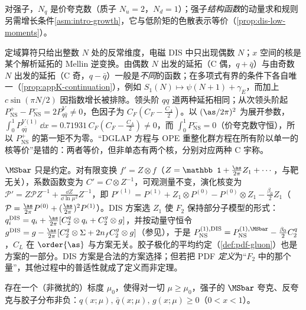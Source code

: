 对强子，$N_q$ 是价夸克数（质子 $N_u=2$，$N_d=1$）；强子\emph{结构函数}的动量求和规则另需增长条件\cref{asm:intro-growth}，它与低阶矩的色散表示等价（\cref{prop:dis-low-moments}）。

\begin{remark}\label{rem:pdf-ns-plusminus}
定域算符只给出整数 $N$ 处的反常维度，电磁 DIS 中只出现偶数 $N$；$x$ 空间的核是某个解析延拓的 Mellin 逆变换。由偶数 $N$ 出发的延拓（C 偶，$q+\bar q$）与由奇数 $N$ 出发的延拓（C 奇，$q-\bar q$）一般是\emph{不同}的函数；在多项式有界的条件下各自唯一（\cref{prop:appK-continuation}），例如 $S_1(N)\mapsto\psi(N+1)+\gamma_E$，而加上 $c\sin(\pi N/2)$ 因指数增长被排除。领头阶 $qq$ 道两种延拓相同；从次领头阶起 $P^+_{\mathrm{NS}}-P^-_{\mathrm{NS}}=2P^V_{q\bar q}\ne0$，色因子为 $C_F(C_F-\frac{C_A}2)$\cite{CurciFurmanskiPetronzio1980}。以 $(\as/2\pi)^2$ 为展开参数，$\int_0^1P^{V(1)}_{q\bar q}\,\dd x=0.71931\,C_F(C_F-\frac{C_A}2)\ne0$，而 $\int_0^1P^-_{\mathrm{NS}}=0$（价夸克数守恒），所以 $P^+_{\mathrm{NS}}$ 的第一矩不为零。“DGLAP 方程与 OPE 重整化群方程在所有阶以单一的核等价”是错的：两者等价，但非单态有两个核，分别对应两种 C 宇称。
\end{remark}

\begin{remark}[方案变换]\label{rem:pdf-schemes}
$\MSbar$ 只是约定。对有限变换 $f'=Z\otimes f$（$Z=\mathbb 1+\frac{\as}{2\pi}Z_1+\cdots$，与靶无关），系数函数变为 $C'=C\otimes Z^{-1}$，可观测量不变，演化核变为 $\mathcal P'=Z\mathcal PZ^{-1}+\frac{\dd Z}{\dd\ln\mu^2}Z^{-1}$，即 $P'^{(1)}=P^{(1)}+Z_1\otimes P^{(0)}-P^{(0)}\otimes Z_1-\frac{\beta_0}2Z_1$（$\mathcal P=\frac{\as}{2\pi}P^{(0)}+(\frac{\as}{2\pi})^2P^{(1)}$）。DIS 方案选 $Z_1$ 使 $F_2$ 保持部分子模型的形式：$q^{\mathrm{DIS}}_i=q_i+\frac{\as}{2\pi}[C_2^q\otimes q_i+C_2^g\otimes g]$，并按动量守恒令 $g^{\mathrm{DIS}}=g-\frac{\as}{2\pi}[C_2^q\otimes\Sigma+2n_fC_2^g\otimes g]$（参见\cite{DiemozEtAl1988}），于是 $P^{(1),\mathrm{DIS}}_{\mathrm{NS}}=P^{(1),\MSbar}_{\mathrm{NS}}-\frac{\beta_0}2C_2^q$，$C_L$ 在 $\order{\as}$ 与方案无关。胶子极化的平均约定（\cref{def:pdf-gluon}）也是方案的一部分。DIS 方案是合法的方案选择；但若把 PDF \emph{定义}为“$F_2$ 中的那个量”，其他过程中的普适性就成了定义而非定理。
\end{remark}

\begin{conjecture}\label{conj:pdf-positivity}
存在一个（非微扰的）标度 $\mu_0$，使得对一切 $\mu\ge\mu_0$，强子的 $\MSbar$ 夸克、反夸克与胶子分布非负：$q(x;\mu),\,\bar q(x;\mu),\,g(x;\mu)\ge0$（$0<x<1$）。
\end{conjecture}


